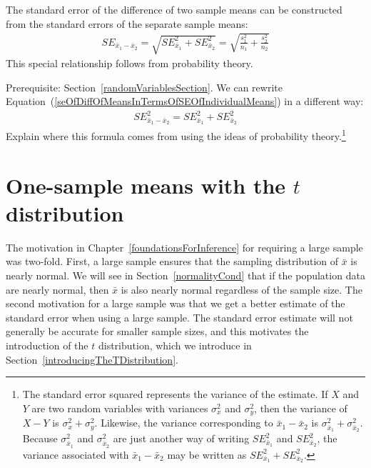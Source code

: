 The standard error of the difference of two sample means can be constructed from the standard errors of the separate sample means:
\begin{eqnarray}
SE_{\bar{x}_{1} - \bar{x}_{2}}
	= \sqrt{SE_{\bar{x}_1}^2 + SE_{\bar{x}_2}^2}
	= \sqrt{\frac{s_1^2}{{n_1}} + \frac{s_2^2}{{n_2}}}
\label{seOfDiffOfMeansInTermsOfSEOfIndividualMeans}
\end{eqnarray}
This special relationship follows from probability theory.

\begin{exercise}\label{derivingSEForDiffOfTwoMeansExercise}
Prerequisite: Section~\ref{randomVariablesSection}.
We can rewrite Equation~(\ref{seOfDiffOfMeansInTermsOfSEOfIndividualMeans}) in a different way:
\begin{eqnarray*}
SE_{\bar{x}_{1} - \bar{x}_{2}}^2 = SE_{\bar{x}_1}^2 + SE_{\bar{x}_2}^2
\end{eqnarray*}
Explain where this formula comes from using the ideas of probability theory.\footnote{The standard error squared represents the variance of the estimate. If $X$ and $Y$ are two random variables with variances $\sigma_x^2$ and $\sigma_y^2$, then the variance of $X-Y$ is $\sigma_x^2 + \sigma_y^2$. Likewise, the variance corresponding to $\bar{x}_1 - \bar{x}_2$ is $\sigma_{\bar{x}_1}^2 + \sigma_{\bar{x}_2}^2$. Because $\sigma_{\bar{x}_1}^2$ and $\sigma_{\bar{x}_2}^2$ are just another way of writing $SE_{\bar{x}_1}^2$ and  $SE_{\bar{x}_2}^2$, the variance associated with $\bar{x}_1 - \bar{x}_2$ may be written as $SE_{\bar{x}_1}^2 + SE_{\bar{x}_2}^2$.}
\end{exercise}


\section{One-sample means with the $t$ distribution}
\label{oneSampleMeansWithTDistribution}

The motivation in Chapter~\ref{foundationsForInference} for requiring a large sample was two-fold. First, a large sample ensures that the sampling distribution of $\bar{x}$ is nearly normal. We will see in Section~\ref{normalityCond} that if the population data are nearly normal, then $\bar{x}$ is also nearly normal regardless of the sample size. The second motivation for a large sample was that we get a better estimate of the standard error when using a large sample. The standard error estimate will not generally be accurate for smaller sample sizes, and this motivates the introduction of the $t$ distribution, which we introduce in Section~\ref{introducingTheTDistribution}.

